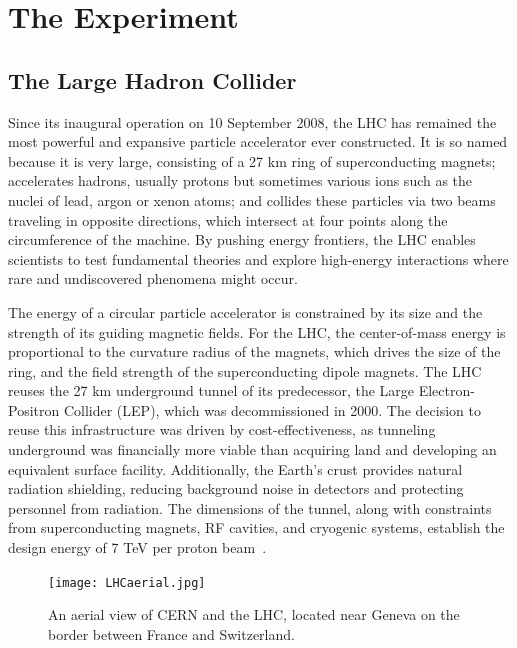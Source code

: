 \chapter{The Experiment} \label{chap:chap-3}







\section{The Large Hadron Collider} \label{chap:LHC}

Since its inaugural operation on 10 September 2008, the LHC has remained the most powerful and expansive particle accelerator ever constructed. It is so named because it is very large, consisting of a 27 km ring of superconducting magnets; accelerates hadrons, usually protons but sometimes various ions such as the nuclei of lead, argon or xenon atoms; and collides these particles via two beams traveling in opposite directions, which intersect at four points along the circumference of the machine. By pushing energy frontiers, the LHC enables scientists to test fundamental theories and explore high-energy interactions where rare and undiscovered phenomena might occur.

The energy of a circular particle accelerator is constrained by its size and the strength of its guiding magnetic fields. For the LHC, the center-of-mass energy is proportional to the curvature radius of the magnets, which drives the size of the ring, and the field strength of the superconducting dipole magnets. The LHC reuses the 27 km underground tunnel of its predecessor, the Large Electron-Positron Collider (LEP), which was decommissioned in 2000. The decision to reuse this infrastructure was driven by cost-effectiveness, as tunneling underground was financially more viable than acquiring land and developing an equivalent surface facility.  Additionally, the Earth's crust provides natural radiation shielding, reducing background noise in detectors and protecting personnel from radiation. The dimensions of the tunnel, along with constraints from superconducting magnets, RF cavities, and cryogenic systems, establish the design energy of 7 TeV per proton beam~\cite{CERNBroc79}.


\begin{figure}[!hbt]
    \begin{center}
        \texttt{[image: LHCaerial.jpg]}
        \caption{An aerial view of CERN and the LHC, located near Geneva on the border between France and Switzerland.}
        \label{fig:LHCaerial}
    \end{center}
\end{figure}

